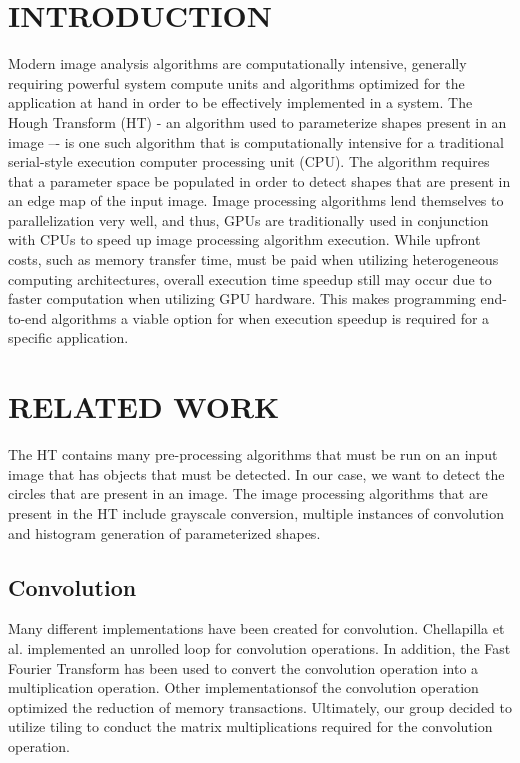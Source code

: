 \documentclass[12pt]{article}
\begin{document}
\section{\MakeUppercase{Introduction}}
\noindent
Modern image analysis algorithms are computationally intensive, generally requiring powerful system compute units and algorithms optimized for the application at hand in order to be effectively implemented in a system. 
The Hough Transform (HT)\cite{BALLARD1981111} - an algorithm used to parameterize shapes present in an image –- is one such algorithm that is computationally intensive for a traditional serial-style execution computer processing unit (CPU).
The algorithm requires that a parameter space be populated in order to detect shapes that are present in an edge map of the input image.
Image processing algorithms lend themselves to parallelization very well, and thus, GPUs are traditionally used in conjunction with CPUs to speed up image processing algorithm execution.
While upfront costs, such as memory transfer time, must be paid when utilizing heterogeneous computing architectures, overall execution time speedup still may occur due to faster computation when utilizing GPU hardware.
This makes programming end-to-end algorithms a viable option for when execution speedup is required for a specific application.


\section{\MakeUppercase{Related Work}}
The HT contains many pre-processing algorithms that must be run on an input image that has objects that must be detected.
In our case, we want to detect the circles that are present in an image.
The image processing algorithms that are present in the HT include grayscale conversion, multiple instances of convolution and histogram generation of parameterized shapes.

\subsection{Convolution}
Many different implementations have been created for convolution. Chellapilla et al.\cite{document-parsing} implemented an unrolled loop for convolution operations.
In addition, the Fast Fourier Transform has been used to convert the convolution operation into a multiplication operation\cite{vasilache2015fast}.
Other implementations\cite{9229640}of the convolution operation optimized the reduction of memory transactions.
Ultimately, our group decided to utilize tiling to conduct the matrix multiplications required for the convolution operation.
\end{document}
